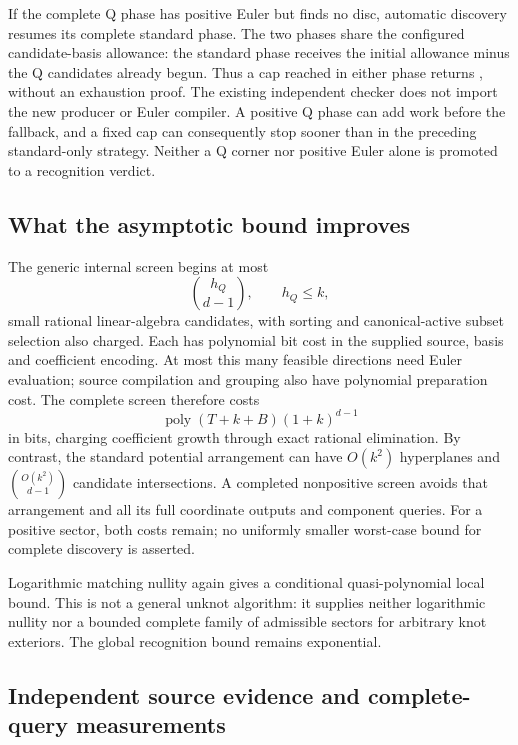 If the complete Q phase has positive Euler but finds no disc, automatic
discovery resumes its complete standard phase. The two phases share the
configured candidate-basis allowance: the standard phase receives the
initial allowance minus the Q candidates already begun. Thus a cap reached
in either phase returns , without an exhaustion proof.
The existing independent checker does not import the new producer or Euler
compiler. A positive Q phase can add work before the fallback, and a fixed
cap can consequently stop sooner than in the preceding standard-only
strategy. Neither a Q corner nor positive Euler alone is promoted to a
recognition verdict.

\subsection{What the asymptotic bound improves}

The generic internal screen begins at most
\[
                         \binom{h_Q}{d-1},\qquad h_Q\le k,
\]
small rational linear-algebra candidates, with sorting and canonical-active
subset selection also charged. Each has polynomial bit cost in
the supplied source, basis and coefficient encoding. At most this many
feasible directions need Euler evaluation; source compilation and grouping
also have polynomial preparation cost. The complete screen therefore costs
\[
                  \operatorname{poly}(T+k+B)(1+k)^{d-1}
\]
in bits, charging coefficient growth through exact rational elimination.
By contrast, the standard potential arrangement can have $O(k^2)$
hyperplanes and $\binom{O(k^2)}{d-1}$ candidate intersections. A completed
nonpositive screen avoids that arrangement and all its full coordinate
outputs and component queries. For a positive sector, both costs remain;
no uniformly smaller worst-case bound for complete discovery is asserted.

Logarithmic matching nullity again gives a conditional quasi-polynomial
local bound. This is not a general unknot algorithm: it supplies neither
logarithmic nullity nor a bounded complete family of admissible sectors for
arbitrary knot exteriors. The global recognition bound remains exponential.

\subsection{Independent source evidence and complete-query measurements}

